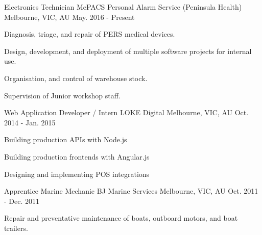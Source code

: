 

\begin{cventries}

  \cventry
    {Electronics Technician} %
    {MePACS Personal Alarm Service (Peninsula Health)} %
    {Melbourne, VIC, AU} %
    {May. 2016 - Present} %
    {
      \begin{cvitems} %
        \item {Diagnosis, triage, and repair of PERS medical devices.}
        \item {Design, development, and deployment of multiple software projects for internal use.}
        \item {Organisation, and control of warehouse stock.}
        \item {Supervision of Junior workshop staff.}
      \end{cvitems}
    }

   \cventry
    {Web Application Developer / Intern } %
    {LOKE Digital} %
    {Melbourne, VIC, AU} %
    {Oct. 2014 - Jan. 2015} %
    {
      \begin{cvitems} %
        \item {Building production APIs with Node.js}
        \item {Building production frontends with Angular.js}
        \item {Designing and implementing POS integrations}
      \end{cvitems}
    }

    \cventry
    {Apprentice Marine Mechanic}
    {BJ Marine Services}
    {Melbourne, VIC, AU}
    {Oct. 2011 - Dec. 2011}
    {
      \begin{cvitems}
        \item {Repair and preventative maintenance of  boats, outboard motors, and boat trailers.}
      \end{cvitems}
    }


\end{cventries}
